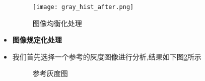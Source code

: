 \documentclass[UTF8,a4paper,10pt]{ctexart}
\begin{document}
\begin{flushleft}
\begin{itemize}
\begin{figure}[htbp]
{\begin{minipage}[t]{0.3\linewidth}
                        \centering
                        \texttt{[image: gray\_hist\_after.png]}
                    \end{minipage}%
                }%
                \caption{图像均衡化处理}
                \label{fig:fig_gray_hist_final}
            \end{figure}
            \newpage
            \item \textbf{图像规定化处理}\\
            \item 我们首先选择一个参考的灰度图像进行分析,结果如下图\ref{fig:fig_gray_hist_regular_refer_final}所示\\
            \begin{figure}[htbp]
                \centering
                \caption{参考灰度图}
                \label{fig:fig_gray_hist_regular_refer_final}
            \end{figure}

\end{itemize}
\end{flushleft}
\end{document}
